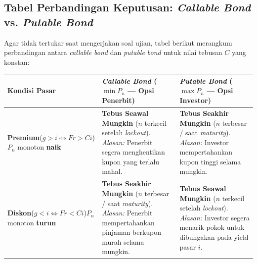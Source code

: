 \documentclass[11pt,a4paper]{article}
\begin{document}
\subsection{Tabel Perbandingan Keputusan: \textit{Callable Bond} vs. \textit{Putable Bond}}

Agar tidak tertukar saat mengerjakan soal ujian, tabel berikut merangkum perbandingan antara \textit{callable bond} dan \textit{putable bond} untuk nilai tebusan $C$ yang konstan:

\begin{center}
\renewcommand{\arraystretch}{1.35}
\begin{tabular}{p{3.2cm}p{5.5cm}p{5.5cm}}
\toprule
\textbf{Kondisi Pasar} & \textbf{\textit{Callable Bond} ($\min P_n$ — Opsi Penerbit)} & \textbf{\textit{Putable Bond} ($\max P_n$ — Opsi Investor)} \\
\midrule
\textbf{Premium}\newline ($g > i \iff Fr > Ci$)\newline $P_n$ monoton \textbf{naik} &
\textbf{Tebus Seawal Mungkin} ($n$ terkecil setelah \textit{lockout}).\newline
\textit{Alasan:} Penerbit segera menghentikan kupon yang terlalu mahal. &
\textbf{Tebus Seakhir Mungkin} ($n$ terbesar / saat \textit{maturity}).\newline
\textit{Alasan:} Investor mempertahankan kupon tinggi selama mungkin. \\
\midrule
\textbf{Diskon}\newline ($g < i \iff Fr < Ci$)\newline $P_n$ monoton \textbf{turun} &
\textbf{Tebus Seakhir Mungkin} ($n$ terbesar / saat \textit{maturity}).\newline
\textit{Alasan:} Penerbit mempertahankan pinjaman berkupon murah selama mungkin. &
\textbf{Tebus Seawal Mungkin} ($n$ terkecil setelah \textit{lockout}).\newline
\textit{Alasan:} Investor segera menarik pokok untuk dibungakan pada yield pasar $i$. \\
\bottomrule
\end{tabular}
\end{center}
\end{document}
